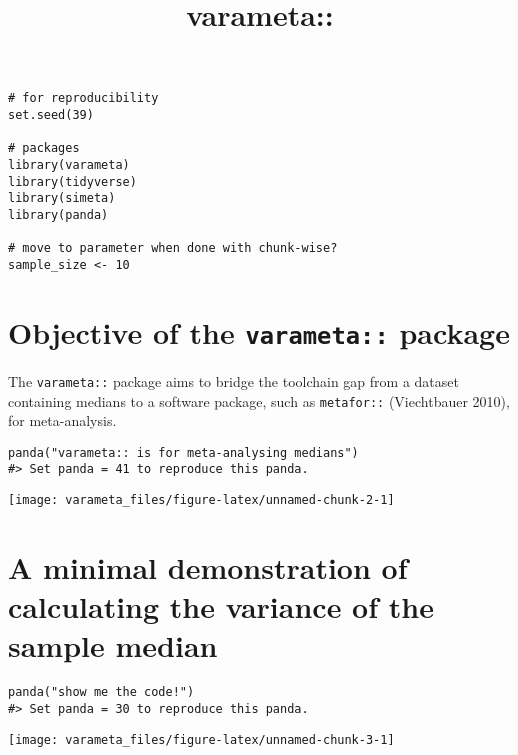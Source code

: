\documentclass[
]{article}
\title{varameta::}
\author{}
\date{\vspace{-2.5em}}
\begin{document}
\maketitle

{
\setcounter{tocdepth}{2}
\tableofcontents
}
\begin{verbatim}
# for reproducibility
set.seed(39)

# packages
library(varameta)
library(tidyverse)
library(simeta)
library(panda)

# move to parameter when done with chunk-wise?
sample_size <- 10
\end{verbatim}

\hypertarget{objective-of-the-varameta-package}{%
\section{\texorpdfstring{Objective of the \texttt{varameta::}
package}{Objective of the varameta:: package}}\label{objective-of-the-varameta-package}}

The \texttt{varameta::} package aims to bridge the toolchain gap from a
dataset containing medians to a software package, such as
\texttt{metafor::} (Viechtbauer 2010), for meta-analysis.

\begin{verbatim}
panda("varameta:: is for meta-analysing medians")
#> Set panda = 41 to reproduce this panda.
\end{verbatim}

\begin{center}\texttt{[image: varameta\_files/figure-latex/unnamed-chunk-2-1]} \end{center}

\hypertarget{a-minimal-demonstration-of-calculating-the-variance-of-the-sample-median}{%
\section{A minimal demonstration of calculating the variance of the
sample
median}\label{a-minimal-demonstration-of-calculating-the-variance-of-the-sample-median}}

\begin{verbatim}
panda("show me the code!")
#> Set panda = 30 to reproduce this panda.
\end{verbatim}

\begin{center}\texttt{[image: varameta\_files/figure-latex/unnamed-chunk-3-1]} \end{center}
\end{document}
